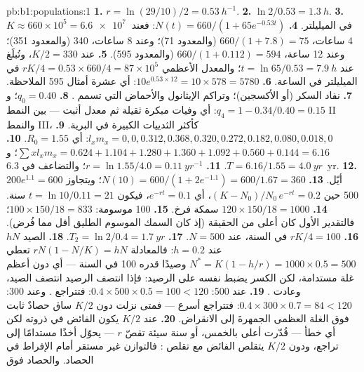 \begin{solution}{pb:b1:populations:1}
\textbf{1.} $r = \ln(29/10)/2 = \qty{0.53}{h^{-1}}$.
\textbf{2.} $\ln 2/0.53 = \qty{1.3}{h}$.
\textbf{3.} $K \approx 660\times 10^5 = \qty{6.6e7}{}$  في
الميليلتر.
\textbf{4.} $N(t) = 660/(1 + 65e^{-0.53t})$: فعند 4 ساعات، $660/(1 + 7.8) =
75$ (والمعدود 71)؛ وعند 8 ساعات، 340 (والمعدود 351)؛ وعند 12 ساعة، $660/(1 + 0.112) = 594$
(والمعدود 595).
\textbf{5.} عند $K/2 = 330$، وتُبلَغ عند $t = \ln 65/0.53 = \qty{7.9}{h}$؛
والمعدل الأعظمي $rK/4 = 0.53\times 660/4 = 87\times 10^5$  في
الميليلتر في الساعة.
\textbf{6.} $10e^{0.53\times 12} = 10\times 578 = 5780$: أي عشرة أمثال
595 الملاحظة.
\textbf{7.} نفاد السكر (أو الأكسجين)؛ وتراكم الإيثانول والأحماض
التي تسمم .
\textbf{8.} $q_0 = 0.40$؛ و$q_4 = 1 - 0.34/0.40 = 0.15$: أي وفيات
مبكرة ثقيلة ثم معدل أثبت --- بين النمط II والنمط III، كأكثر
الثدييات الكبيرة في البرية.
\textbf{9.} $l_x m_x = 0, 0, 0.312, 0.368, 0.320, 0.272, 0.182, 0.080,
0.018, 0$: أي $R_0 = 1.55$.
\textbf{10.} $\sum x l_x m_x = 0.624 + 1.104 + 1.280 + 1.360 + 1.092 +
0.560 + 0.144 = 6.16$؛ و$T = 6.16/1.55 = \qty{4.0}{yr}$.
\textbf{11.} $r = \ln 1.55/4.0 = \qty{0.11}{yr^{-1}}$؛ والتضاعف في
\qty{6.3}{yr}.
\textbf{12.} $200e^{1.1} = 600$ أيّل.
\textbf{13.} $N(10) = 600/(1 + 2e^{-1.1}) = 600/1.67 = 360$؛ ويتجاوز 500
حين $(K - N_0)/N_0\,e^{-rt} = 0.2$، أي $e^{-rt} = 0.1$، فيكون $t = \ln
10/0.11 = 21$ سنة.
\textbf{14.} $120\times 150/18 = 1000$ سمكة فرخ.
\textbf{15.} 100 موسومة: $100\times 150/18 = 833$؛ فالتقدير الأول
كان أعلى من الحقيقة (إذ كان السمك الموسوم الطليق أقل مما فُرض).
\textbf{16.} $rK/4 = 100$ في السنة، عند $N = 500$.
\textbf{17.} $T_2 = \ln 2/0.4 = \qty{1.7}{yr}$.
\textbf{18.} الصيد $hN$ عند $h = 0.2$: فالمعادلة $rN(1 - N/K) = hN$ تعطي $N^* =
K(1 - h/r) = 1000\times 0.5 = 500$ وصيدًا قدره \num{100} في السنة ---
أي دون أعظم غلة مستدامة، لكن الكسر يضبط نفسه على الرصيد: فإذا
انتصف الرصيد انتصف الصيد، وعادت .
\textbf{19.} عند 500: $0.4\times 500\times 0.5 = 100 < 120$: فتتراجع
. وعند 300: $0.4\times 300\times 0.7 = 84 < 120$:
فتتراجع أسرع --- فمتى نزلت دون $K/2$ ساق حصادٌ ثابت فوق الغلة
العظمى الجمهرةَ إلى الانقراض.
\textbf{20.} عند $K/2$ يكون الفائض في ذروته لكن أي خطأ ---
 قُدّرت أعلى بالخمس، أو سنة سيئة تقصّ $r$ ---
يحوّل أخذًا مستدامًا إلى تراجع، ودون $K/2$ يتقلص الفائض مع تقلص
: فالتوازن غير مستقر أمام الإفراط في الحصاد. والحصاد فوق

\end{solution}
